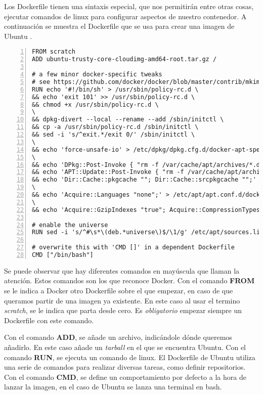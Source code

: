 	Los Dockerfile tienen una sintaxis especial, que nos permitirán entre otras cosas, ejecutar comandos de linux para configurar aspectos de nuestro contenedor. A continuación se muestra el Dockerfile que se usa para crear una imagen de Ubuntu \cite{ubuntu-dockerfile}.
	
	\begin{lstlisting}[style=consola,numbers=left]
FROM scratch
ADD ubuntu-trusty-core-cloudimg-amd64-root.tar.gz /

# a few minor docker-specific tweaks
# see https://github.com/docker/docker/blob/master/contrib/mkimage/debootstrap
RUN echo '#!/bin/sh' > /usr/sbin/policy-rc.d \
&& echo 'exit 101' >> /usr/sbin/policy-rc.d \
&& chmod +x /usr/sbin/policy-rc.d \
\
&& dpkg-divert --local --rename --add /sbin/initctl \
&& cp -a /usr/sbin/policy-rc.d /sbin/initctl \
&& sed -i 's/^exit.*/exit 0/' /sbin/initctl \
\
&& echo 'force-unsafe-io' > /etc/dpkg/dpkg.cfg.d/docker-apt-speedup \
\
&& echo 'DPkg::Post-Invoke { "rm -f /var/cache/apt/archives/*.deb /var/cache/apt/archives/partial/*.deb /var/cache/apt/*.bin || true"; };' > /etc/apt/apt.conf.d/docker-clean \
&& echo 'APT::Update::Post-Invoke { "rm -f /var/cache/apt/archives/*.deb /var/cache/apt/archives/partial/*.deb /var/cache/apt/*.bin || true"; };' >> /etc/apt/apt.conf.d/docker-clean \
&& echo 'Dir::Cache::pkgcache ""; Dir::Cache::srcpkgcache "";' >> /etc/apt/apt.conf.d/docker-clean \
\
&& echo 'Acquire::Languages "none";' > /etc/apt/apt.conf.d/docker-no-languages \
\
&& echo 'Acquire::GzipIndexes "true"; Acquire::CompressionTypes::Order:: "gz";' > /etc/apt/apt.conf.d/docker-gzip-indexes

# enable the universe
RUN sed -i 's/^#\s*\(deb.*universe\)$/\1/g' /etc/apt/sources.list

# overwrite this with 'CMD []' in a dependent Dockerfile
CMD ["/bin/bash"]
	\end{lstlisting}

	Se puede observar que hay diferentes comandos en mayúscula que llaman la atención. Estos comandos son los que reconoce Docker. Con el comando \textbf{FROM} se le indica a Docker otro Dockerfile sobre el que empezar, en caso de que queramos partir de una imagen ya existente. En este caso al usar el termino \textit{scratch}, se le indica que parta desde cero. Es \emph{obligatorio} empezar siempre un Dockerfile con este comando.
	
	Con el comando \textbf{ADD}, se añade un archivo, indicándole dónde queremos añadirlo. En este caso añade un \textit{tarball} en el que se encuentra Ubuntu. Con el comando \textbf{RUN}, se ejecuta un comando de linux. El Dockerfile de Ubuntu utiliza una serie de comandos para realizar diversas tareas, como definir repositorios. Con el comando \textbf{CMD}, se define un comportamiento por defecto a la hora de lanzar la imagen, en el caso de Ubuntu se lanza una terminal en bash.
	
